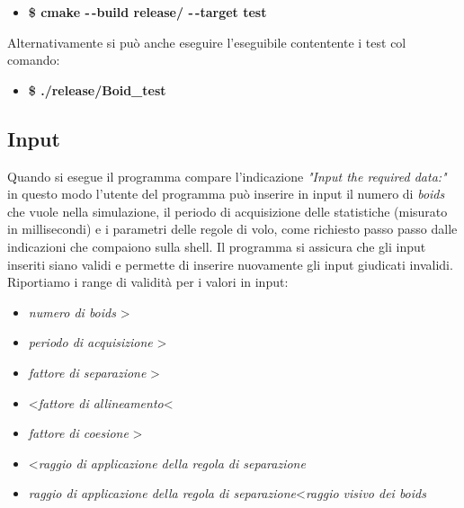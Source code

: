 \documentclass{article}
\begin{document}
\begin{itemize}
    \item \textbf{\$ cmake -\,-build release/ -\,-target test}
\end{itemize}

\begin{flushleft}
    Alternativamente si può anche eseguire l'eseguibile contentente i test col comando:
\end{flushleft}

\begin{itemize}
    \item \textbf{\$ ./release/Boid\_test}
\end{itemize}




\subsection{Input}

Quando si esegue il programma compare l'indicazione \textit{"Input the required data:"} in questo modo l'utente del programma può inserire in input il numero di \textit{boids} che vuole nella simulazione, il periodo di acquisizione delle statistiche (misurato in millisecondi) e i parametri delle regole di volo, come richiesto passo passo dalle indicazioni che compaiono sulla shell. Il programma si assicura che gli input inseriti siano validi e permette di inserire nuovamente gli input giudicati invalidi. Riportiamo i range di validità per i valori in input:

\begin{itemize}
\item \:\textit{numero di boids} \textgreater{} 
\item  \:\textit{periodo di acquisizione} \textgreater{} 
\item  \:\textit{fattore di separazione} \textgreater{}  
\item  {}\;\textless\;\textit{fattore di allineamento}\;\textless{}  
\item  \:\textit{fattore di coesione} \textgreater{}  
\item  {}\;\textless\;\textit{raggio di applicazione della regola di separazione}
\item \:\textit{raggio di applicazione della regola di separazione}\;\textless\;\textit{raggio visivo dei boids}
\end{itemize}
\end{document}
